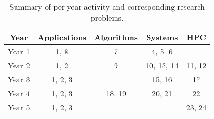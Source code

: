 
\begin{table}
\centering
\begin{tabular}{|c|c|c|c|c|}
  \toprule
  {\bf Year} & {\bf Applications} & {\bf Algorithms} & {\bf Systems} & {\bf HPC}  \\
  \midrule
  Year 1  & 1, 8    & 7      & 4, 5, 6    &        \\
  Year 2  & 1, 2    & 9      & 10, 13, 14 & 11, 12 \\
  Year 3  & 1, 2, 3 &        & 15, 16     & 17     \\
  Year 4  & 1, 2, 3 & 18, 19 & 20, 21     & 22     \\
  Year 5  & 1, 2, 3 &        &            & 23, 24 \\
  \bottomrule
\end{tabular}
\caption{Summary of per-year activity and corresponding research problems.}
\label{tab:timneline}
\vspace{-0.3cm}
\end{table}


\iffalse
{}

